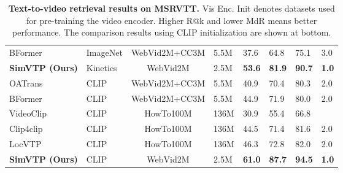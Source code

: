 \documentclass[10pt,twocolumn,letterpaper]{article}
\begin{document}
\begin{table*}[t]
\begin{tabular}{llclllll}
	BFormer \cite{ge2022bridgeformer} & ImageNet           & WebVid2M+CC3M    & 5.5M    & 37.6 & 64.8 & 75.1 & 3.0   \\
	\textbf{SimVTP (Ours)}      & Kinetics           & WebVid2M         & 2.5M    & \textbf{53.6} &\textbf{81.9} & \textbf{90.7} & \textbf{1.0}   \\
	\toprule
	OATrans \cite{wang2022object}        & CLIP               & WebVid2M+CC3M    & 5.5M    & 40.9 & 70.4 & 80.3 & 2.0   \\
	BFormer \cite{ge2022bridgeformer}        & CLIP               & WebVid2M+CC3M   & 5.5M    & 44.9 & 71.9 & 80.0 & 2.0   \\
	VideoClip \cite{xu2021videoclip}       & CLIP               & HowTo100M        & 136M    & 30.9 & 55.4 & 66.8 & \text { - }   \\
	Clip4clip \cite{luo2022clip4clip}      & CLIP               & HowTo100M        & 136M    & 44.5 & 71.4 & 81.6 & 2.0   \\
	LocVTP \cite{cao2022locvtp}        & CLIP               & HowTo100M    & 136M    & 46.3 & 72.8 & 82.0 & 2.0   \\
\textbf{SimVTP (Ours)}           & CLIP             & WebVid2M        & 2.5M   &  \textbf{61.0}    &   \textbf{87.7}   &  \textbf{94.5}    &  \textbf{1.0} \\
	\toprule
\end{tabular}
\caption{\textbf{Text-to-video retrieval results on MSRVTT.} Vis Enc. Init denotes datasets used for pre-training the video encoder. Higher R@k and lower MdR means better performance. The comparison results using CLIP initialization are shown at bottom.} \label{tb:retri-msrvtt}
\end{table*}
\end{document}
